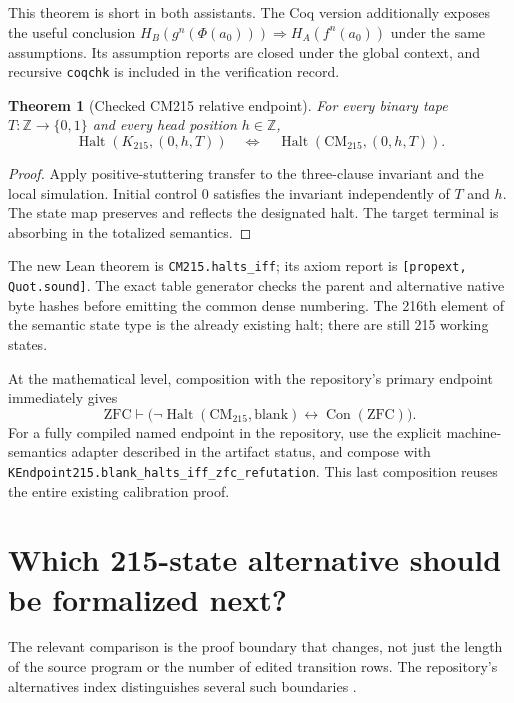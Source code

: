 \documentclass[11pt,letterpaper]{article}
\newtheorem{theorem}{Theorem}[section]
\theoremstyle{definition}\newtheorem{definition}[theorem]{Definition}
\theoremstyle{remark}\newtheorem{remark}[theorem]{Remark}
\newcommand{\Con}{\operatorname{Con}}
\newcommand{\Halt}{\operatorname{Halt}}
\newcommand{\K}{K_{215}}
\newcommand{\CM}{\mathrm{CM}_{215}}
\begin{document}
This theorem is short in both assistants. The Coq version additionally
exposes the useful conclusion
$H_B(g^n(\Phi(a_0)))\Rightarrow H_A(f^n(a_0))$ under the same assumptions.
Its assumption reports are closed under the global context, and recursive
\texttt{coqchk} is included in the verification record.

\begin{theorem}[Checked CM215 relative endpoint]
For every binary tape $T:\mathbb Z\to\{0,1\}$ and every head position
$h\in\mathbb Z$,
\[
 \Halt(\K,(0,h,T))\quad\Longleftrightarrow\quad
 \Halt(\CM,(0,h,T)).
\]
\end{theorem}

\begin{proof}
Apply positive-stuttering transfer to the three-clause invariant and the
local simulation. Initial control 0 satisfies the invariant independently
of $T$ and $h$. The state map preserves and reflects the designated halt.
The target terminal is absorbing in the totalized semantics.
\end{proof}

The new Lean theorem is \texttt{CM215.halts\_iff}; its axiom report is
\texttt{[propext, Quot.sound]}. The exact table generator checks the parent
and alternative native byte hashes before emitting the common dense
numbering. The 216th element of the semantic state type is the already
existing halt; there are still 215 working states.

\AdapterStatus

At the mathematical level, composition with the repository's primary
endpoint immediately gives
\[
 \mathrm{ZFC}\vdash
 \bigl(\neg\Halt(\CM,\mathrm{blank})\leftrightarrow\Con(\mathrm{ZFC})\bigr).
\]
For a fully compiled named endpoint in the repository, use the explicit
machine-semantics adapter described in the artifact status, and compose
with \texttt{KEndpoint215.blank\_halts\_iff\_zfc\_refutation}. This last
composition reuses the entire existing calibration proof.

\section{Which 215-state alternative should be formalized next?}

The relevant comparison is the proof boundary that changes, not just the
length of the source program or the number of edited transition rows.
The repository's alternatives index distinguishes several such boundaries
\cite{alternatives}.
\end{document}
